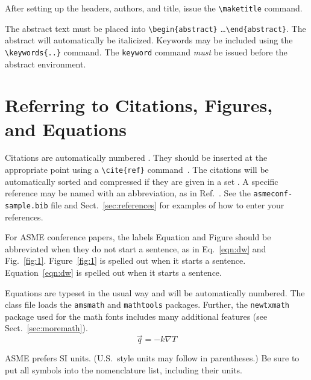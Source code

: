 \documentclass[varvw,largesc,upint,mathalfa=cal=euler,hyphenate,balance,lang-second=french,lang=english,colorlinks]{asmeconf} %
\begin{document}
After setting up the headers, authors,  and title, issue the \verb|\maketitle| command. 

The abstract text must be placed into \verb|\begin{abstract}| \ldots \verb|\end{abstract}|. The abstract will automatically be italicized. Keywords may be included using the \verb|\keywords{..}| command. The \texttt{keyword} command \textit{must} be issued before the abstract environment. 



\section{Referring to Citations, Figures, and Equations}
Citations are automatically numbered \cite{ning2002}. They should be inserted at the appropriate point using a \verb|\cite{ref}| command~\cite{gibson2008,stevens1999}. The citations will be automatically sorted and compressed if they are given in a set \cite{stevens1999,ning2002,gibson2008,wions2005,smith2002,watson1982}. 
A specific reference may be named with an abbreviation, as in Ref.~\cite{watson1982}.
See the \texttt{asmeconf-sample.bib} file and Sect.~\ref{sec:references} for examples of how to enter your references.

For ASME conference papers, the labels Equation and Figure should be abbreviated when they do not start a sentence, as in  Eq.~\eqref{eqn:dw} and Fig.~\ref{fig:1}. Figure~\ref{fig:1} is spelled out when it starts a sentence. Equation~\eqref{eqn:dw} is spelled out when it starts a sentence. 

Equations are typeset in the usual way and will be automatically numbered.  The class file loads the \texttt{amsmath} and \texttt{mathtools} packages. Further, the \texttt{newtxmath} package used for the math fonts includes many additional features (see Sect.~\ref{sec:moremath}).
\begin{equation}\label{eqn:fourier}
\vec{q} = -k\nabla T
\end{equation}

ASME prefers SI units. (U.S.\ style units may follow in parentheses.) Be sure to put all symbols into the nomenclature list, including their units.


\end{document}
